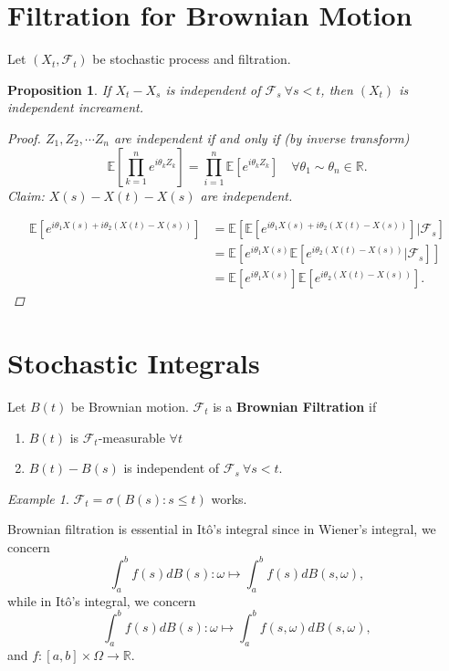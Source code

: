 \documentclass[12pt]{report}
\newcommand{\F}{\mathcal{F}}
\newcommand{\E}{\mathbb{E}}
\renewcommand{\1}{\mathbb{1}}
\theoremstyle{break}
\theoremstyle{newdef}
\newtheorem{pro}[thm]{Proposition}
\theoremstyle{remark}
\newtheorem*{exmp}{Example} %
\begin{document}
\section{Filtration for Brownian Motion}
Let $(X_t, \F_t)$ be stochastic process and filtration.
\begin{pro}
If $X_t - X_s$ is independent of $\F_s \ \forall s < t$, then $(X_t)$ is independent increament.
\begin{proof}
$Z_1, Z_2, \cdots Z_n$ are independent if and only if (by inverse transform)
$$
\E\left[\prod_{k=1}^n e^{i\theta_k Z_k}\right] = \prod_{i=1}^n \E\left[e^{i\theta_k Z_k}\right] \quad \forall \theta_1 \sim \theta_n \in \mathbb{R}.
$$
Claim: $X(s) - X(t) - X(s)$ are independent.

$$
\begin{aligned}
\E\left[e^{i\theta_1 X(s) + i\theta_2 (X(t) - X(s))}\right]
&= \E \left[ \E\left[e^{i\theta_1 X(s) + i\theta_2 (X(t) - X(s))}\right] | \F_s \right]\\
&= \E\left[ e^{i\theta_1 X(s)} \E\left[ e^{i\theta_2 (X(t)-X(s))} | \F_s \right] \right]\\
&= \E\left[ e^{i\theta_1 X(s)} \right] \E\left[ e^{i\theta_2 (X(t)-X(s))} \right].
\end{aligned}
$$
\end{proof}
\end{pro}

\section{Stochastic Integrals}
Let $B(t)$ be Brownian motion.
$\F_t$ is a \textbf{Brownian Filtration} if
\begin{enumerate}
\item $B(t)$ is $\F_t$-measurable $\forall t$
\item $B(t) - B(s)$ is independent of $\F_s \ \forall s < t$.
\end{enumerate}

\begin{exmp}
$\F_t = \sigma(B(s) : s \leq t )$ works.
\end{exmp}


Brownian filtration is essential in It\^o's integral since
in Wiener's integral, we concern
$$\int_a^b f(s) dB(s) : \omega \mapsto \int_a^b f(s) dB(s,\omega),$$
while
in It\^o's integral, we concern
$$\int_a^b f(s) dB(s) : \omega \mapsto \int_a^b f(s,\omega) dB(s, \omega),$$
and $f : [a,b] \times \Omega \rightarrow \mathbb{R}$.
\end{document}
